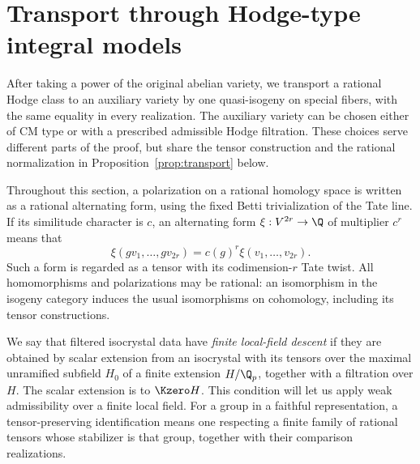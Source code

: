 \section{Transport through Hodge-type integral models}
\label{sec:transport}

After taking a power of the original abelian variety, we transport a
rational Hodge class to an auxiliary variety by one quasi-isogeny on
special fibers, with the same equality in every
realization. The auxiliary variety can be chosen either of CM type or
with a prescribed admissible Hodge filtration. These choices serve
different parts of the proof, but share the tensor construction and the
rational normalization in Proposition~\ref{prop:transport} below.

Throughout this section, a polarization on a rational homology space is
written as a rational alternating form, using the fixed Betti
trivialization of the Tate line.  If its similitude character is $c$,
an alternating form $\xi:V^{2r}\to\Q$ of multiplier $c^r$ means that
\begin{equation}
 \xi(gv_1,\ldots,gv_{2r})=c(g)^r\xi(v_1,\ldots,v_{2r}).
 \label{eq:transport-multiplier}
\end{equation}
Such a form is regarded as a tensor with its codimension-$r$ Tate
twist.  All homomorphisms and polarizations may be rational: an
isomorphism in the isogeny category induces the usual isomorphisms on
cohomology, including its tensor constructions.

We say that filtered isocrystal data have \emph{finite local-field
descent} if they are obtained by scalar extension from an isocrystal
with its tensors over the maximal unramified subfield \(H_0\) of a
finite extension \(H/\Q_p\), together with a filtration over \(H\).
The scalar extension is to \(\Kzero H\). This condition will let us
apply weak admissibility over a finite local field.
For a group in a faithful representation, a tensor-preserving
identification means one respecting a finite family of rational tensors
whose stabilizer is that group, together with their comparison realizations.

